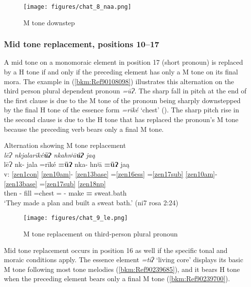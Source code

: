 \documentclass[output=paper]{langscibook}
\begin{document}
\begin{figure}
    \centering
    \texttt{[image: figures/chat\_8\_naa.png]}
    \caption{M tone downstep}
    \label{fig:chat:key:8}
\end{figure}


\subsubsection{Mid tone replacement, positions 10{}--17}
\label{bkm:Ref113308436}
A mid tone on a monomoraic element in position 17 (short pronoun) is replaced by a H tone if and only if the preceding element has only a M tone on its final mora. The example in (\ref{bkm:Ref90108098}) illustrates this alternation on the third person plural dependent pronoun \textit{=ūɁ}. The sharp fall in pitch at the end of the first clause is due to the M tone of the pronoun being sharply downstepped by the final H tone of the essence form \textit{=rīké} `chest' (). The sharp pitch rise in the second clause is due to the H tone that has replaced the pronoun's M tone because the preceding verb bears only a final M tone.


\ea\label{bkm:Ref90108098}Alternation showing M tone replacement\\
{} \textit{lēɁ nkjalarīké\textbf{ūɁ} nkahnʲā\textbf{úɁ} jaą} \\ 
    \glll {} lēɁ nk- jala =rīké \textbf{=ūɁ} nka- hnʲā \textbf{=ūɁ} jaą \\
    v: \ref{zen1con} \ref{zen10am}{}- \ref{zen13base} =\ref{zen16ess} =\ref{zen17sub} \ref{zen10am}{}- \ref{zen13base} =\ref{zen17sub} \ref{zen18np} \\ 
    {} then \Pfv{}- fill =chest =\Third\Pl{} \Pfv{}- make \textbf{=\Third\Pl{}}  sweat.bath \\
    \glt `They made a plan and built a sweat bath.' (ni7 rosa 2:24)
\z

\begin{figure}
    \centering
    \texttt{[image: figures/chat\_9\_le.png]}
    \caption{M tone replacement on third-person plural pronoun}
    \label{fig:chat:key:9}
\end{figure}

Mid tone replacement occurs in position 16 as well if the specific tonal and moraic conditions apply. The essence element \textit{=tīʔ} `living core' displays its basic M tone following most tone melodies (\ref{bkm:Ref90239685}), and it bears H tone when the preceding element bears only a final M tone (\ref{bkm:Ref90239700}). 
\end{document}
